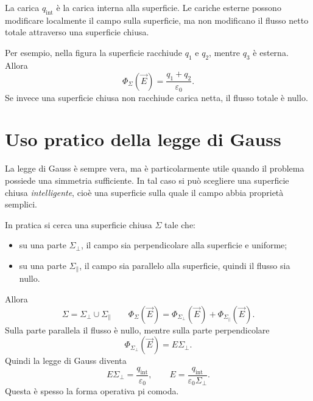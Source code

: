 \documentclass[a4paper]{article}
\begin{document}
La carica \(q_{\mathrm{int}}\) è la carica interna alla superficie. Le cariche esterne possono modificare localmente il campo sulla superficie, ma non modificano il flusso netto totale attraverso una superficie chiusa.

\begin{center}
\end{center}

Per esempio, nella figura la superficie racchiude \(q_1\) e \(q_2\), mentre \(q_3\) è esterna. Allora
\[
    \Phi_\Sigma(\vec{E})=\frac{q_1+q_2}{\varepsilon_0}.
\]
Se invece una superficie chiusa non racchiude carica netta, il flusso totale è nullo.

\section{Uso pratico della legge di Gauss}

La legge di Gauss è sempre vera, ma è particolarmente utile quando il problema possiede una simmetria sufficiente. In tal caso si può scegliere una superficie chiusa \emph{intelligente}, cioè una superficie sulla quale il campo abbia proprietà semplici.

In pratica si cerca una superficie chiusa \(\Sigma\) tale che:
\begin{itemize}
    \item su una parte \(\Sigma_\perp\), il campo sia perpendicolare alla superficie e uniforme;
    \item su una parte \(\Sigma_\parallel\), il campo sia parallelo alla superficie, quindi il flusso sia nullo.
\end{itemize}
Allora
\[
    \Sigma=\Sigma_\perp\cup\Sigma_\parallel
    \qquad
    \Phi_\Sigma(\vec{E})=
    \Phi_{\Sigma_\perp}(\vec{E})+\Phi_{\Sigma_\parallel}(\vec{E}).
\]
Sulla parte parallela il flusso è nullo, mentre sulla parte perpendicolare
\[
    \Phi_{\Sigma_\perp}(\vec{E})=E\Sigma_\perp.
\]
Quindi la legge di Gauss diventa
\[
    E\Sigma_\perp=\frac{q_{\mathrm{int}}}{\varepsilon_0},
    \qquad
    E=\frac{q_{\mathrm{int}}}{\varepsilon_0\Sigma_\perp}.
\]
Questa è spesso la forma operativa pi comoda.
\end{document}
